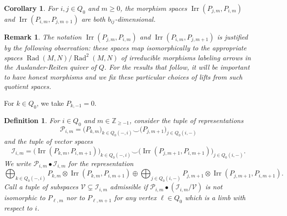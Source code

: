 \documentclass{amsart}
\newtheorem{corollary}[theorem]{Corollary}
\newtheorem{definition}[theorem]{Definition}
\newtheorem{remark}[theorem]{Remark}
\numberwithin{equation}{section}
\newcommand{\ZZ}{\mathbb{Z}}
\newcommand{\cI}{\mathcal{I}}
\newcommand{\cP}{\mathcal{P}}
\newcommand{\cV}{\mathcal{V}}
\newcommand{\Irr}{\operatorname{Irr}}
\newcommand{\Rad}{\operatorname{Rad}}
\begin{document}
\begin{corollary}
  For $i,j\in Q_0$ and $m\ge0$, the morphism spaces $\Irr(P_{j,m},P_{i,m})$ and $\Irr(P_{i,m},P_{j,m+1})$ are both $b_{ij}$-dimensional.
\end{corollary}
\begin{remark}
  The notation $\Irr(P_{j,m},P_{i,m})$ and $\Irr(P_{i,m},P_{j,m+1})$ is justified by the following observation: these spaces map isomorphically to the appropriate spaces $\Rad(M,N)/\Rad^2(M,N)$ of irreducible morphisms labeling arrows in the Auslander-Reiten quiver of $Q$.
  For the results that follow, it will be important to have honest morphisms and we fix these particular choices of lifts from such quotient spaces.
\end{remark}

For $k\in Q_0$, we take $P_{k,-1}=0$.
\begin{definition}
  For $i\in Q_0$ and $m\in\ZZ_{\ge-1}$, consider the tuple of representations 
  \[\cP_{i,m}=\big(P_{k,m}\big)_{k\in Q_0(-,i)} \smile\big(P_{j,m+1}\big)_{j\in Q_0(i,-)}\]
  and the tuple of vector spaces 
  \[\cI_{i,m}=\big(\Irr(P_{k,m},P_{i,m+1})\big)_{k\in Q_0(-,i)} \smile\big(\Irr(P_{j,m+1},P_{i,m+1})\big)_{j\in Q_0(i,-)}.\]
  We write $\cP_{i,m}\bullet\cI_{i,m}$ for the representation
  \[\bigoplus_{k\in Q_0(-,i)} P_{k,m}\otimes \Irr(P_{k,m},P_{i,m+1}) \oplus \bigoplus_{j\in Q_0(i,-)} P_{j,m+1}\otimes\Irr(P_{j,m+1},P_{i,m+1}).\]
  Call a tuple of subspaces $\cV\subsetneq\cI_{i,m}$ \emph{admissible} if $\cP_{i,m}\bullet(\cI_{i,m}/\cV)$ is not isomorphic to $P_{\ell,m}$ nor to $P_{\ell,m+1}$ for any vertex $\ell\in Q_0$ which is a limb with respect to $i$.
\end{definition}
\end{document}
